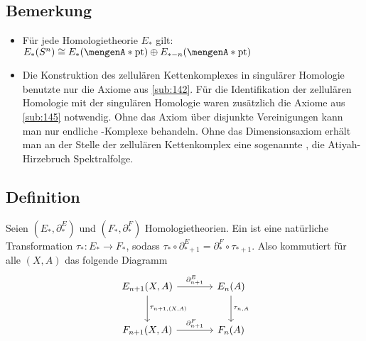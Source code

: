 \subsection[Bemerkung zur Homologie der Sphäre und zur zellulären Homologie]{Bemerkung} %
\label{sub:147}
\begin{itemize}
	\item Für jede Homologietheorie $E_*$ gilt: 
	\(
		E_*(S^n) \cong E_* \enbrace*{\set{\mathrm{pt}}} \oplus E_{*-n} \enbrace*{\set{\mathrm{pt}} }  
	\)
	\item Die Konstruktion des zellulären Kettenkomplexes in singulärer Homologie benutzte nur die Axiome aus \ref{sub:142}. Für die Identifikation der zellulären Homologie 
	mit der singulären Homologie waren zusätzlich die Axiome aus \ref{sub:145} notwendig. Ohne das Axiom über disjunkte Vereinigungen kann man nur endliche \CW-Komplexe 
	behandeln. Ohne das Dimensionsaxiom erhält man an der Stelle der zellulären Kettenkomplex eine sogenannte , die Atiyah-Hirzebruch Spektralfolge. 
\end{itemize}

\subsection[Definition: Morphismus von Homologietheorien]{Definition} %
\label{sub:148}
Seien $(E_*,\partial_*^E)$ und $(F_*,\partial_*^F)$ Homologietheorien. Ein  ist eine natürliche Transformation
$\tau_* \colon E_* \to F_*$, sodass $\tau_* \circ \partial_{*+1}^E = \partial_*^F \circ \tau_{*+1}$. Also kommutiert für alle $(X,A)$ das folgende Diagramm
\[
	\begin{tikzcd}[sep=large]
		E_{n+1}(X,A) \rar["\partial_{n+1}^E"] \dar["\tau_{n+1,(X,A)}"] & E_n(A) \dar["\tau_{n,A}"] \\
		F_{n+1}(X,A) \rar["\partial_{n+1}^F"] & F_n(A)
	\end{tikzcd}
\]

